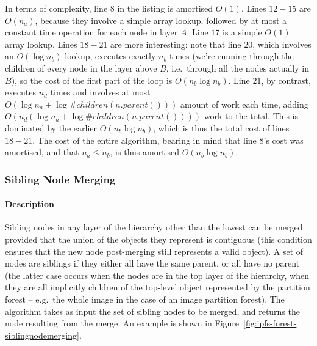 In terms of complexity, line $8$ in the listing is amortised $O(1)$. Lines $12-15$ are $O(n_a)$, because they involve a simple array lookup, followed by at most a constant time operation for each node in layer $A$. Line $17$ is a simple $O(1)$ array lookup. Lines $18-21$ are more interesting: note that line $20$, which involves an $O(\log n_b)$ lookup, executes exactly $n_b$ times (we're running through the children of every node in the layer above $B$, i.e.~through all the nodes actually in $B$), so the cost of the first part of the loop is $O(n_b \log n_b)$. Line $21$, by contrast, executes $n_d$ times and involves at most $O(\log n_a + \log \#\mathit{children}(\mathit{n.parent()}))$ amount of work each time, adding $O(n_d (\log n_a + \log \#\mathit{children}(\mathit{n.parent()})))$ work to the total. This is dominated by the earlier $O(n_b \log n_b)$, which is thus the total cost of lines $18-21$. The cost of the entire algorithm, bearing in mind that line $8$'s cost was amortised, and that $n_a \le n_b$, is thus amortised $O(n_b \log n_b)$.

\afterpage{\clearpage}
\newpage

\subsubsection{Sibling Node Merging}

\paragraph{Description}

Sibling nodes in any layer of the hierarchy other than the lowest can be merged provided that the union of the objects they represent is contiguous (this condition ensures that the new node post-merging still represents a valid object). A set of nodes are siblings if they either all have the same parent, or all have no parent (the latter case occurs when the nodes are in the top layer of the hierarchy, when they are all implicitly children of the top-level object represented by the partition forest -- e.g.~the whole image in the case of an image partition forest). The algorithm takes as input the set of sibling nodes to be merged, and returns the node resulting from the merge. An example is shown in Figure~\ref{fig:ipfs-forest-siblingnodemerging}.

